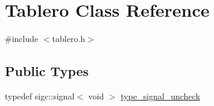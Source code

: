 \hypertarget{classTablero}{\section{Tablero Class Reference}
\label{classTablero}
}


{\ttfamily \#include $<$tablero.\-h$>$}

\subsection*{Public Types}
\begin{DoxyCompactItemize}
\item 
typedef sigc\-::signal$<$ void $>$ \hyperlink{classTablero_a1c847f6d745139e22ca87a32f82ded14}{type\-\_\-signal\-\_\-uncheck}
\end{DoxyCompactItemize}
